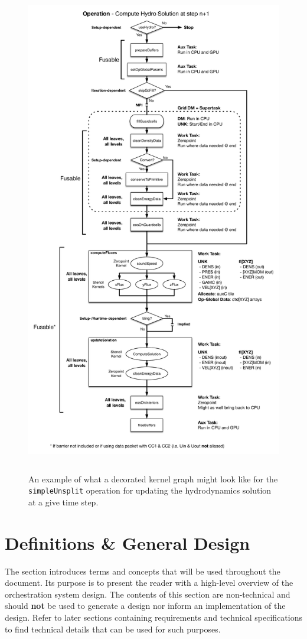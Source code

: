 \documentclass{article}
\begin{document}
\begin{figure}[!hp]
\begin{center}
\includegraphics[height=8.5in]{simpleUnsplitFlow.pdf}
\caption[]{An example of what a decorated kernel graph might look like for the
\texttt{simpleUnsplit} operation for updating the hydrodynamics solution at a
give time step.}
\label{fig:simpleUnsplitKernelGraph}
\end{center}
\end{figure}

\newpage
\section{Definitions \& General Design}
\label{sec:Definitions}
The section introduces terms and concepts that will be used throughout the
document.  Its purpose is to present the reader with a high-level overview of
the orchestration system design.  The contents of this section are non-technical
and should \textbf{not} be used to generate a design nor inform an
implementation of the design.  Refer to later sections containing requirements
and technical specifications to find technical details that can be used for such
purposes.\\
\end{document}

